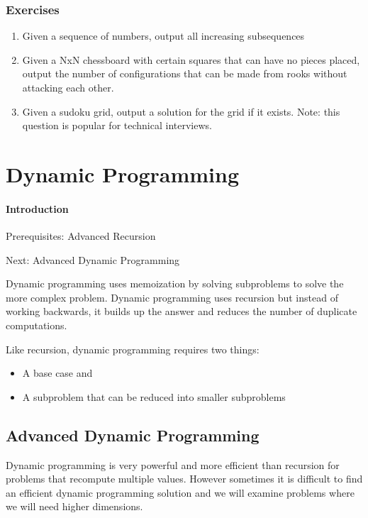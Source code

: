 \documentclass[11pt,oneside]{book}
\begin{document}
\subsection{Exercises}

\begin{enumerate}
\item Given a sequence of numbers, output all increasing subsequences
\item Given a NxN chessboard with certain squares that can have no pieces placed, output the number of configurations that can be made from rooks without attacking each other.
\item Given a sudoku grid, output a solution for the grid if it exists. Note: this question is popular for technical interviews.
\end{enumerate}
\chapter{Dynamic Programming}\subsubsection{Introduction}

Prerequisites: Advanced Recursion

Next: Advanced Dynamic Programming

Dynamic programming uses memoization by solving subproblems to solve the more complex problem. Dynamic programming uses recursion but instead of working backwards, it builds up the answer and reduces the number of duplicate computations.

Like recursion, dynamic programming requires two things:

\begin{itemize}
\item A base case and
\item A subproblem that can be reduced into smaller subproblems 
\end{itemize}

\section{Advanced Dynamic Programming}

Dynamic programming is very powerful and more efficient than recursion for problems that recompute multiple values. However sometimes it is difficult to find an efficient dynamic programming solution and we will examine problems where we will need higher dimensions.
\end{document}
